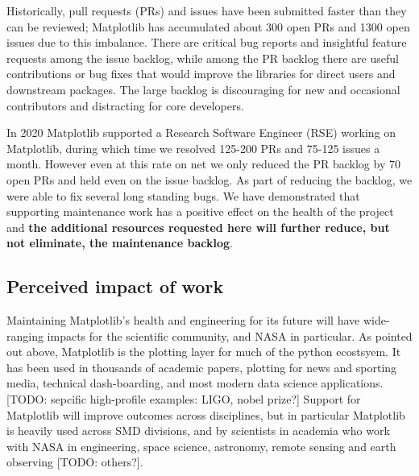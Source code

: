 \documentclass[12pt]{article}
\numberwithin{page}{section}
\begin{document}



Historically, pull requests (PRs) and issues have been submitted
faster than they can be reviewed; Matplotlib has accumulated about 300
open PRs and 1300 open issues due to this imbalance. There are
critical bug reports and insightful feature requests among the issue
backlog, while among the PR backlog there are useful contributions or
bug fixes that would improve the libraries for direct users and
downstream packages.  The large backlog is discouraging for new and
occasional contributors and distracting for core developers.

In 2020 Matplotlib supported a Research Software Engineer (RSE)
working on Matplotlib, during which time we resolved 125-200 PRs and
75-125 issues a month.  However even at this rate on net we only
reduced the PR backlog by 70 open PRs and held even on the issue
backlog.  As part of reducing the backlog, we were able to fix several
long standing bugs.  We have demonstrated that supporting maintenance
work has a positive effect on the health of the project and
\textbf{the additional resources requested here will further reduce,
  but not eliminate, the maintenance backlog}.



\subsection{Perceived impact of work}
\label{sec:piw}

Maintaining Matplotlib's health and engineering for its future will
have wide-ranging impacts for the scientific community, and NASA in
particular.  As pointed out above, Matplotlib is the plotting layer
for much of the python ecostsyem.  It has been used in thousands of
academic papers, plotting for news and sporting media, technical
dash-boarding, and most modern data science applications. [TODO:
  sepcific high-profile examples: LIGO, nobel prize?] Support for
Matplotlib will improve outcomes across disciplines, but in particular
Matplotlib is heavily used across SMD divisions, and by scientists in
academia who work with NASA in engineering, space science, astronomy,
remote sensing and earth observing [TODO: others?].
\end{document}
